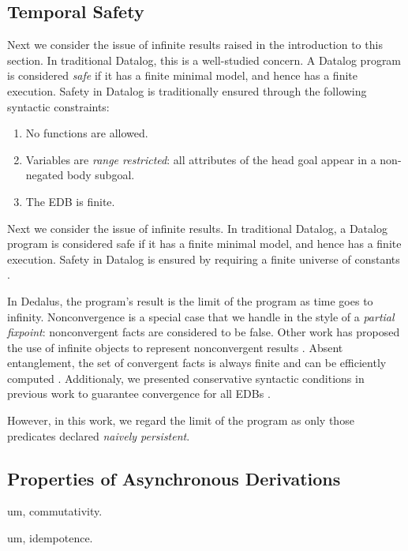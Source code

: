 \subsection{Temporal Safety}
Next we consider the issue of infinite results raised in the introduction to this section.
In traditional Datalog, this is a well-studied concern.
A Datalog program is considered {\em safe} if it has a finite minimal model, and hence has
a finite execution.  Safety in Datalog is traditionally ensured
through the following syntactic constraints:

\begin{enumerate}
%
\item No functions are allowed.
%
\item Variables are \emph{range restricted}: all attributes of the head goal
appear in a non-negated body subgoal.
%
\item The EDB is finite.
%
\end{enumerate}



Next we consider the issue of infinite results.  In traditional Datalog, a Datalog program is considered safe if it has a finite
minimal model, and hence has a finite execution. Safety in Datalog is ensured by requiring a finite universe of constants .

In Dedalus, the program's result is the limit of the program as time goes to infinity.  Nonconvergence is a special case that we handle in the style of a {\em partial fixpoint}: nonconvergent facts are considered to be false.  Other work has proposed the use of infinite objects to represent nonconvergent results .  Absent entanglement, the set of convergent facts is always finite and can be efficiently computed .  Additionaly, we presented conservative syntactic conditions in previous work to guarantee convergence for all EDBs .

However, in this work, we regard the limit of the program as only those predicates declared {\em naively persistent}.  

\subsection{Properties of Asynchronous Derivations}

um, commutativity.

um, idempotence.

